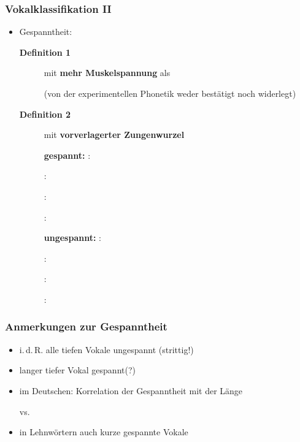 \begin{frame}
\frametitle{Vokalklassifikation II}

\begin{itemize}
	\item Gespanntheit:

\begin{description}
	\item[\textbf{Definition 1}] \textipa{[ i:, y:, u:, o: ]} mit \textbf{mehr Muskelspannung} als \textipa{[ i:, y:, u:, o: ]} 
	
	(von der experimentellen Phonetik weder bestätigt noch widerlegt)
	
	\item[\textbf{Definition 2}] \textipa{[ i:, y:, u:, o: ]}  mit \textbf{vorverlagerter Zungenwurzel}


\begin{multicols}{2}

\textbf{gespannt:}
	\ea \textipa{[ i: ]}: 
	
	\ex \textipa{[ y: ]}: 
	
	\ex \textipa{[ u: ]}: 
	
	\ex \textipa{[ o: ]}: 
	
	\z 
	
\columnbreak
	
\textbf{ungespannt:}
	\ea \textipa{[ I ]}: 
	
	\ex \textipa{[ Y ]}: 
	
	\ex \textipa{[ U ]}: 
	
	\ex \textipa{[ O ]}: 
	
	\z
	
\end{multicols}

\end{description}
\end{itemize}
			
\end{frame}		

			
\begin{frame}
\frametitle{Anmerkungen zur Gespanntheit}
		\begin{itemize}	
			\item i.\,d.\,R. alle tiefen Vokale \ras ungespannt (strittig!)
			\item langer tiefer Vokal \textipa{[ a: ]} \ras gespannt(?)

	      \item im Deutschen: Korrelation der Gespanntheit mit der Länge

		\ea \textipa{[ m i: t @ ]} vs. \textipa{[ m I t @ ]}
		\z

		\item in Lehnwörtern auch kurze gespannte Vokale

		\ea \textipa{[ P i . d e: ]}
		\z
		
	\end{itemize}
	
\end{frame}


